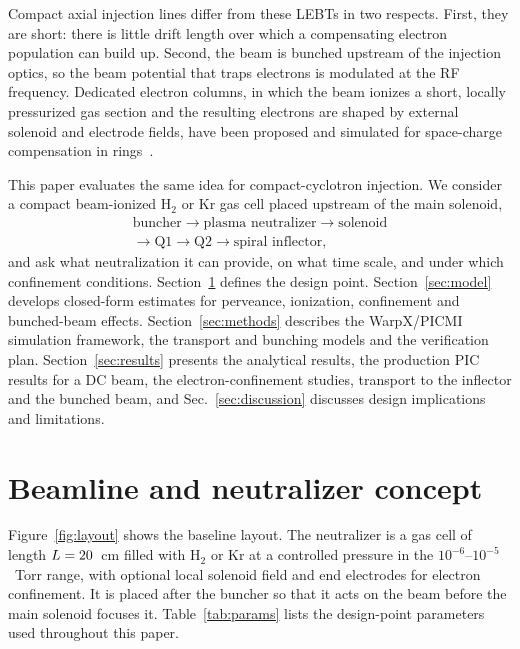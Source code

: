 \documentclass[aps,prab,10pt,twocolumn,superscriptaddress,showpacs,floatfix]{revtex4-2}
\newcommand{\Htwo}{\mathrm{H}_2}
\begin{document}
Compact axial injection lines differ from these LEBTs in two respects. First, they
are short: there is little drift length over which a compensating electron population
can build up. Second, the beam is bunched upstream of the injection optics, so
the beam potential that traps electrons is modulated at the RF frequency. Dedicated
electron columns, in which the beam ionizes a short, locally pressurized gas section
and the resulting electrons are shaped by external solenoid and electrode fields, have
been proposed and simulated for space-charge compensation in rings~\cite{Freemire2018,Park2020}.

This paper evaluates the same idea for compact-cyclotron injection. We consider a
compact beam-ionized $\Htwo$ or Kr gas cell placed upstream of the main solenoid,
\begin{multline*}
\text{buncher}\rightarrow\text{plasma neutralizer}\rightarrow\text{solenoid}\\
\rightarrow\text{Q1}\rightarrow\text{Q2}\rightarrow\text{spiral inflector},
\end{multline*}
and ask what neutralization it can provide, on what time scale, and under which
confinement conditions. Section~\ref{sec:concept} defines the design point.
Section~\ref{sec:model} develops closed-form estimates for perveance, ionization,
confinement and bunched-beam effects. Section~\ref{sec:methods} describes the
WarpX/PICMI simulation framework, the transport and bunching models and the
verification plan. Section~\ref{sec:results} presents the analytical results, the production
PIC results for a DC beam, the electron-confinement studies, transport to the inflector and
the bunched beam, and Sec.~\ref{sec:discussion} discusses design implications and limitations.

\section{Beamline and neutralizer concept}
\label{sec:concept}

Figure~\ref{fig:layout} shows the baseline layout. The neutralizer is a gas cell of
length $L=20$~cm filled with $\Htwo$ or Kr at a controlled pressure in the
$10^{-6}$--$10^{-5}$~Torr range, with optional local solenoid field and end electrodes
for electron confinement. It is placed after the buncher so that it acts on the beam
before the main solenoid focuses it. Table~\ref{tab:params} lists the design-point
parameters used throughout this paper.
\end{document}
